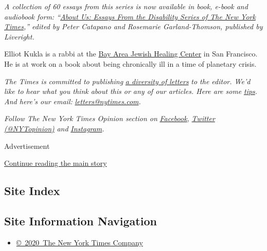 \emph{A collection of 60 essays from this series is now available in
book, e-book and audiobook form:
``}\href{https://www.aboutusbook.com/}{\emph{About Us: Essays From the
Disability Series of The New York Times}}\emph{,'' edited by Peter
Catapano and Rosemarie Garland-Thomson, published by Liveright.}

Elliot Kukla is a rabbi at the
\href{http://www.jewishhealingcenter.org/}{Bay Area Jewish Healing
Center} in San Francisco. He is at work on a book about being
chronically ill in a time of planetary crisis.

\emph{The Times is committed to publishing}
\href{https://www.nytimes.com/2019/01/31/opinion/letters/letters-to-editor-new-york-times-women.html}{\emph{a
diversity of letters}} \emph{to the editor. We'd like to hear what you
think about this or any of our articles. Here are some}
\href{https://help.nytimes.com/hc/en-us/articles/115014925288-How-to-submit-a-letter-to-the-editor}{\emph{tips}}\emph{.
And here's our email:}
\href{mailto:letters@nytimes.com}{\emph{letters@nytimes.com}}\emph{.}

\emph{Follow The New York Times Opinion section on}
\href{https://www.facebook.com/nytopinion}{\emph{Facebook}}\emph{,}
\href{http://twitter.com/NYTOpinion}{\emph{Twitter (@NYTopinion)}}
\emph{and}
\href{https://www.instagram.com/nytopinion/}{\emph{Instagram}}\emph{.}

Advertisement

\protect\hyperlink{after-bottom}{Continue reading the main story}

\hypertarget{site-index}{%
\subsection{Site Index}\label{site-index}}

\hypertarget{site-information-navigation}{%
\subsection{Site Information
Navigation}\label{site-information-navigation}}

\begin{itemize}
\tightlist
\item
  \href{https://help.nytimes.com/hc/en-us/articles/115014792127-Copyright-notice}{©~2020~The
  New York Times Company}
\end{itemize}

